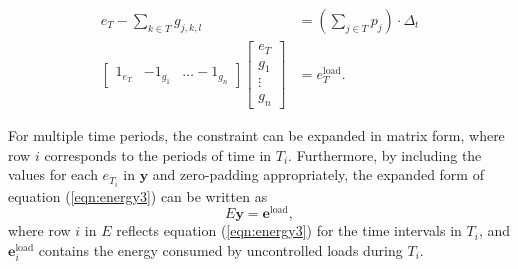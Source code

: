 \begin{equation}\label{eqn:energy3}
	\begin{aligned}
	e_T -\sum_{k\in T}g_{j,k,l} &= \left ( \sum_{j\in T}p_j \right ) \cdot \Delta_t \\
		\begin{bmatrix} 1_{e_T} & -1_{g_1} & \hdots -1_{g_n} \end{bmatrix} \begin{bmatrix}e_T \\ g_1 \\ \vdots \\ g_n \end{bmatrix} &= e^\text{load}_T.
	\end{aligned}
\end{equation}
\par For multiple time periods, the constraint can be expanded in matrix form, where row $i$ corresponds to the periods of time in $T_i$. Furthermore, by including the values for each $e_{T_i}$ in $\mathbf{y}$ and zero-padding appropriately, the expanded form of equation (\ref{eqn:energy3}) can be written as  
\begin{equation}
	E\mathbf{y} = \mathbf{e}^\text{load},
\end{equation}
where row $i$ in $E$ reflects equation (\ref{eqn:energy3}) for the time intervals in $T_i$, and $\mathbf{e}^\text{load}_i$ contains the energy consumed by uncontrolled loads during $T_i$.

